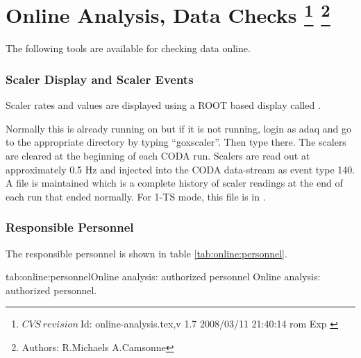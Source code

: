 \chapter[Online Analysis, Data Checks]{Online Analysis, Data Checks
\footnote{
  $CVS~revision~ $Id: online-analysis.tex,v 1.7 2008/03/11 21:40:14 rom Exp $ $
}
\footnote{Authors: R.Michaels  A.Camsonne }
}
 
\par
The following tools are available for checking
data online.


\subsection{Scaler Display and Scaler Events}
Scaler rates and values are displayed using
a ROOT based display called .

Normally this is already running on  but 
if it is not running, login as
adaq and go to the appropriate directory
by typing ``goxscaler''.
Then type  there.  
The scalers are cleared at
the beginning of each CODA run.
Scalers are read out at approximately 0.5 Hz 
and injected into the CODA data-stream 
as event type 140.  A file
 is maintained which is
a complete history of scaler readings at
the end of each run that ended normally.
For 1-TS mode, this file is in .



\begin{safetyen}{10}{15}
\subsection{Responsible  Personnel} 
\end{safetyen}
The responsible personnel is shown in table \ref{tab:online:personnel}.
\begin{namestab}{tab:online:personnel}{Online analysis: authorized personnel}{%
      Online analysis: authorized personnel.}
  \RobertMichaels{}
  \AlexandreCamsonne{}
\end{namestab}

